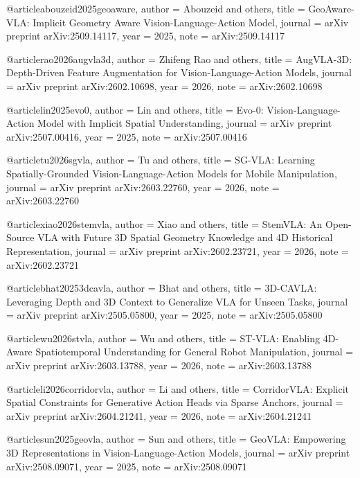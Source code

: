 @article{abouzeid2025geoaware,
  author    = {Abouzeid and others},
  title     = {{GeoAware-VLA}: Implicit Geometry Aware Vision-Language-Action Model},
  journal   = {arXiv preprint arXiv:2509.14117},
  year      = {2025},
  note      = {arXiv:2509.14117}
}

@article{rao2026augvla3d,
  author    = {Zhifeng Rao and others},
  title     = {{AugVLA-3D}: Depth-Driven Feature Augmentation for Vision-Language-Action Models},
  journal   = {arXiv preprint arXiv:2602.10698},
  year      = {2026},
  note      = {arXiv:2602.10698}
}

@article{lin2025evo0,
  author    = {Lin and others},
  title     = {{Evo-0}: Vision-Language-Action Model with Implicit Spatial Understanding},
  journal   = {arXiv preprint arXiv:2507.00416},
  year      = {2025},
  note      = {arXiv:2507.00416}
}

@article{tu2026sgvla,
  author    = {Tu and others},
  title     = {{SG-VLA}: Learning Spatially-Grounded Vision-Language-Action Models for Mobile Manipulation},
  journal   = {arXiv preprint arXiv:2603.22760},
  year      = {2026},
  note      = {arXiv:2603.22760}
}

@article{xiao2026stemvla,
  author    = {Xiao and others},
  title     = {{StemVLA}: An Open-Source {VLA} with Future 3D Spatial Geometry Knowledge and 4D Historical Representation},
  journal   = {arXiv preprint arXiv:2602.23721},
  year      = {2026},
  note      = {arXiv:2602.23721}
}

@article{bhat20253dcavla,
  author    = {Bhat and others},
  title     = {{3D-CAVLA}: Leveraging Depth and 3D Context to Generalize {VLA} for Unseen Tasks},
  journal   = {arXiv preprint arXiv:2505.05800},
  year      = {2025},
  note      = {arXiv:2505.05800}
}

@article{wu2026stvla,
  author    = {Wu and others},
  title     = {{ST-VLA}: Enabling 4D-Aware Spatiotemporal Understanding for General Robot Manipulation},
  journal   = {arXiv preprint arXiv:2603.13788},
  year      = {2026},
  note      = {arXiv:2603.13788}
}

@article{li2026corridorvla,
  author    = {Li and others},
  title     = {{CorridorVLA}: Explicit Spatial Constraints for Generative Action Heads via Sparse Anchors},
  journal   = {arXiv preprint arXiv:2604.21241},
  year      = {2026},
  note      = {arXiv:2604.21241}
}

@article{sun2025geovla,
  author    = {Sun and others},
  title     = {{GeoVLA}: Empowering 3D Representations in Vision-Language-Action Models},
  journal   = {arXiv preprint arXiv:2508.09071},
  year      = {2025},
  note      = {arXiv:2508.09071}
}

